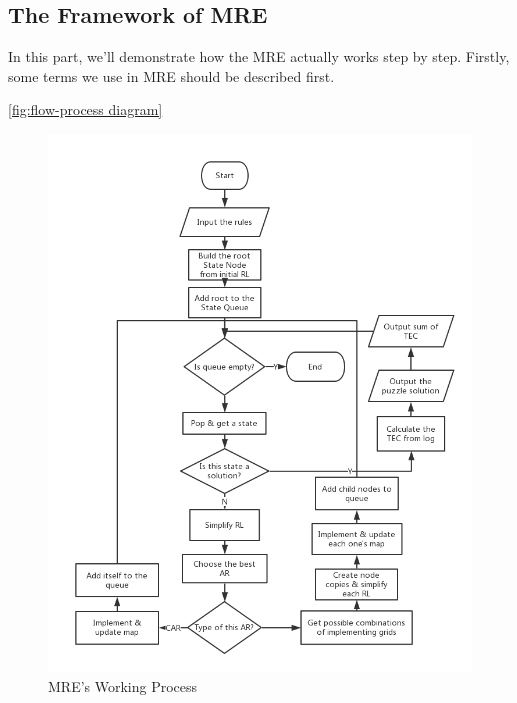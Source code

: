 \subsection{The Framework of MRE}\label{ModelFramework}

In this part, we'll demonstrate how the MRE actually works step by step. Firstly, some terms we use in MRE should be described first.


\ref{fig:flow-process diagram}
\begin{figure}[htb]
	\centering
	\includegraphics[width=0.7\linewidth]{Figures/MRE Process.png}
	\caption{MRE's Working Process}
	\label{MRE Process}
\end{figure}

